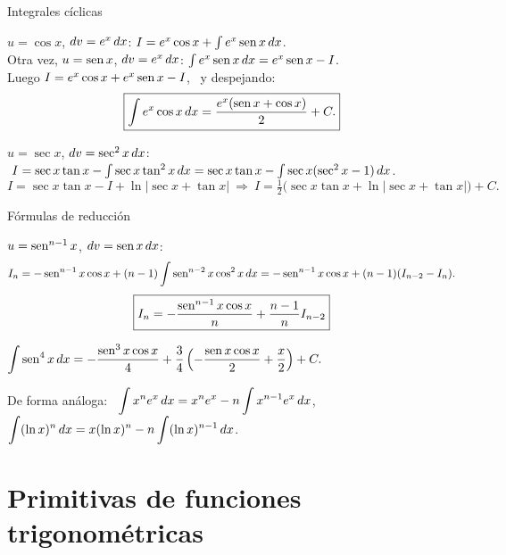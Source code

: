 \documentclass[10pt,aspectratio=169]{beamer}
\begin{document}
\begin{frame}{Integrales cíclicas}
  \begin{ejemplo}[5: $I=\int e^x\cos x\dx$]
    $u=\cos x$, $dv=e^x\,dx$: \quad $I=e^x\cos x+\int e^x\operatorname{sen} x\,dx$.\\[1mm]
    Otra vez, $u=\operatorname{sen} x$, $dv=e^x\,dx$: \quad $\int e^x\operatorname{sen} x\,dx=e^x\operatorname{sen} x-I$.\\[1mm]
    Luego $I=e^x\cos x+e^x\operatorname{sen} x-I$, \ y despejando:
    \[ \boxed{\int e^x\cos x\,dx=\frac{e^x(\operatorname{sen} x+\cos x)}{2}+C.} \]
  \end{ejemplo}
  \begin{ejemplo}
    $u=\sec x$, $dv=\sec^2x\,dx$: $\ I=\sec x\tan x-\int\sec x\tan^2x\,dx=\sec x\tan x-\int\sec x(\sec^2x-1)\,dx$.
    \[ I=\sec x\tan x-I+\ln|\sec x+\tan x| \ \Rightarrow\ I=\tfrac12\big(\sec x\tan x+\ln|\sec x+\tan x|\big)+C. \]
  \end{ejemplo}
\end{frame}

\begin{frame}{Fórmulas de reducción}
  \begin{ejemplo}[7: $I_n=\int\sen^n x\dx$, $n\ge2$]
    $u=\operatorname{sen}^{n-1}x$, $dv=\operatorname{sen} x\,dx$:
    \[ I_n=-\operatorname{sen}^{n-1}x\cos x+(n-1)\int\operatorname{sen}^{n-2}x\cos^2x\,dx
          =-\operatorname{sen}^{n-1}x\cos x+(n-1)(I_{n-2}-I_n). \]
    \[ \boxed{I_n=-\frac{\operatorname{sen}^{n-1}x\cos x}{n}+\frac{n-1}{n}I_{n-2}} \]
  \end{ejemplo}
  \begin{ejemplo}[8]
    $\displaystyle\int\operatorname{sen}^4x\,dx=-\frac{\operatorname{sen}^3x\cos x}{4}+\frac34\left(-\frac{\operatorname{sen} x\cos x}{2}+\frac{x}{2}\right)+C.$
  \end{ejemplo}
  \begin{observacion}
    De forma análoga: \ $\displaystyle\int x^ne^x\,dx=x^ne^x-n\int x^{n-1}e^x\,dx$,
    \quad $\displaystyle\int(\ln x)^n\,dx=x(\ln x)^n-n\int(\ln x)^{n-1}\,dx$.
  \end{observacion}
\end{frame}

\section{Primitivas de funciones trigonométricas}
\end{document}
